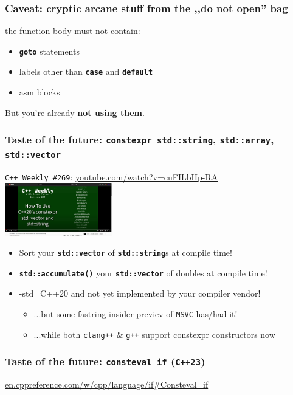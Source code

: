 \documentclass[aspectratio=169]{beamer}
\newcommand{\cpp}[1]{\texttt{\textbf{\textcolor{clCodeBlue}{#1}}}}
\begin{document}
\begin{frame}
\frametitle{Caveat: cryptic arcane stuff from the ,,do not open'' bag}
the function body must not contain:
\begin{itemize}
  \item{\cpp{goto} statements}
  \item{labels other than \cpp{case} and \cpp{default}}
  \item{asm blocks}
\end{itemize}
\vspace{24pt}
But you're already \textbf{not using them}.
\end{frame}

\begin{frame}
\frametitle{Taste of the future: \cpp{constexpr std::string}, \cpp{std::array}, \cpp{std::vector}}
\begin{center}
  \texttt{C++ Weekly \#269}: \href{https://www.youtube.com/watch?v=cuFILbHp-RA}{youtube.com/watch?v=cuFILbHp-RA}\\
  \includegraphics[width=0.35\textwidth]{pics/cppweekly269.png}
\end{center}

\begin{itemize}
  \item{Sort your \cpp{std::vector} of \cpp{std::string}s at compile time!}
  \item{\cpp{std::accumulate()} your \cpp{std::vector} of doubles at compile time!}
  \item{\textcolor{clGreen}{-std=C++20} and not yet implemented by your compiler vendor!}
  \begin{itemize}
    \item{...but some fastring insider previev of \texttt{MSVC} has/had it!}
    \item{...while both \texttt{clang++} \& \texttt{g++} support constexpr constructors now}
  \end{itemize}
\end{itemize}
\end{frame}

\begin{frame}
\frametitle{Taste of the future: \cpp{consteval if} (\textcolor{clGreen}{\texttt{C++23}})}
  \href{https://en.cppreference.com/w/cpp/language/if\#Consteval\_if}{en.cppreference.com/w/cpp/language/if\#Consteval\_if}
\end{frame}
\end{document}
